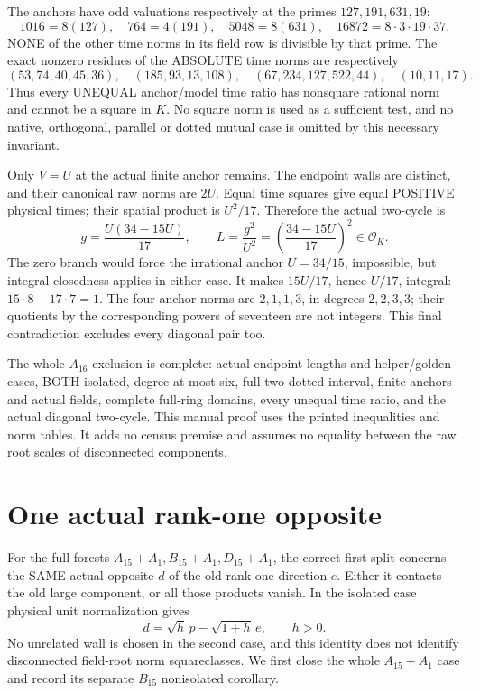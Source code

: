 \documentclass[11pt]{article}
\begin{document}
The anchors have odd valuations respectively at the primes
\(127,191,631,19\):
\[
 1016=8(127),\quad764=4(191),\quad5048=8(631),\quad
 16872=8\cdot3\cdot19\cdot37.
\]
NONE of the other time norms in its field row is divisible by
that prime.  The exact nonzero residues of the ABSOLUTE time norms
are respectively
\[
 (53,74,40,45,36),\quad(185,93,13,108),\quad
 (67,234,127,522,44),\quad(10,11,17).
\]
Thus every UNEQUAL anchor/model time ratio has nonsquare rational
norm and cannot be a square in \(K\).
No square norm is used as a sufficient test, and no native,
orthogonal, parallel or dotted mutual case is omitted by this
necessary invariant.

Only \(V=U\) at the actual finite anchor remains.
The endpoint walls are distinct, and their canonical raw norms
are \(2U\).
Equal time squares give equal POSITIVE physical times;
their spatial product is \(U^2/17\).
Therefore the actual two-cycle is
\[
 g={\frac{U(34-15U)}{17}},\qquad
 L={\frac{g^2}{U^2}}=\left({\frac{34-15U}{17}}\right)^2
                     \in\mathcal O_K .
\]
The zero branch would force the irrational anchor \(U=34/15\),
impossible, but integral closedness applies in either case.
It makes \(15U/17\), hence \(U/17\), integral:
\(15\cdot8-17\cdot7=1\).
The four anchor norms are \(2,1,1,3\), in degrees \(2,2,3,3\);
their quotients by the corresponding powers of seventeen
are not integers.
This final contradiction excludes every diagonal pair too.

The whole-\(A_{16}\) exclusion is complete: actual endpoint
lengths and helper/golden cases, BOTH isolated, degree at most six,
full two-dotted interval, finite anchors and actual fields, complete
full-ring domains, every unequal time ratio, and the actual
diagonal two-cycle.
This manual proof uses the printed inequalities and norm tables.
It adds no census premise and assumes no equality between the raw root
scales of disconnected components.

\section{One actual rank-one opposite}
\label{app:arithrankone}

For the full forests \(A_{15}+A_1,B_{15}+A_1,D_{15}+A_1\),
the correct first split concerns the SAME actual opposite \(d\)
of the old rank-one direction \(e\).
Either it contacts the old large component, or all those products
vanish.  In the isolated case physical unit normalization gives
\[
                 d=\sqrt h\,p-\sqrt{1+h}\,e,\qquad h>0 .
\]
No unrelated wall is chosen in the second case, and this identity
does not identify disconnected field-root norm squareclasses.
We first close the whole \(A_{15}+A_1\) case and record its
separate \(B_{15}\) nonisolated corollary.
\end{document}
